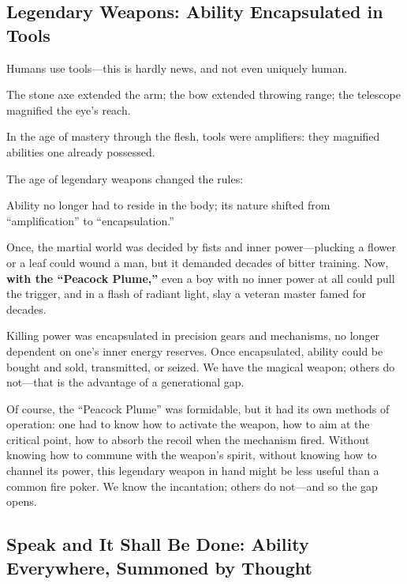 \subsection{Legendary Weapons: Ability Encapsulated in Tools}

Humans use tools---this is hardly news, and not even uniquely human.

The stone axe extended the arm; the bow extended throwing range; the telescope magnified the eye's reach.

In the age of mastery through the flesh, tools were amplifiers: they magnified abilities one already possessed.

The age of legendary weapons changed the rules:

\begin{importantbox}
    Ability no longer had to reside in the body; its nature shifted from ``amplification'' to ``encapsulation.''
\end{importantbox}

Once, the martial world was decided by fists and inner power---plucking a flower or a leaf could wound a man, but it demanded decades of bitter training. Now, \textbf{with the ``Peacock Plume,''} even a boy with no inner power at all could pull the trigger, and in a flash of radiant light, slay a veteran master famed for decades.

\vspace{1em}

Killing power was encapsulated in precision gears and mechanisms, no longer dependent on one's inner energy reserves. Once encapsulated, ability could be bought and sold, transmitted, or seized.
We have the magical weapon; others do not---that is the advantage of a generational gap.

\vspace{1em}

Of course, the ``Peacock Plume'' was formidable, but it had its own methods of operation: one had to know how to activate the weapon, how to aim at the critical point, how to absorb the recoil when the mechanism fired. Without knowing how to commune with the weapon's spirit, without knowing how to channel its power, this legendary weapon in hand might be less useful than a common fire poker.
We know the incantation; others do not---and so the gap opens.

\subsection{Speak and It Shall Be Done: Ability Everywhere, Summoned by Thought}

